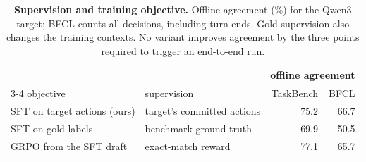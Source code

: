 \begin{table}[htbp]
\centering\small
\caption{\textbf{Supervision and training objective.} Offline agreement (\%) for the Qwen3 target;
BFCL counts all decisions, including turn ends. Gold supervision also changes the training contexts.
No variant improves agreement by the three points required to trigger an end-to-end run.}
\label{tab:objective}
\begin{tabular}{llrr}
\toprule
 & & \multicolumn{2}{c}{offline agreement} \\
\cmidrule(lr){3-4}
objective & supervision & TaskBench & BFCL \\
\midrule
SFT on target actions (ours) & target's committed actions & 75.2 & 66.7 \\
SFT on gold labels & benchmark ground truth & 69.9 & 50.5 \\
GRPO from the SFT draft & exact-match reward & 77.1 & 65.7 \\
\bottomrule
\end{tabular}
\end{table}
